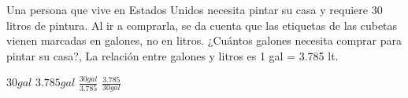 
\question Una persona que vive en Estados Unidos necesita pintar su casa
  y requiere 30 litros de pintura. Al ir a comprarla, se da cuenta que
  las etiquetas de las cubetas vienen marcadas en galones, no en litros.
  ¿Cuántos galones necesita comprar para pintar su casa?, La relación entre
  galones y litros es 1 gal = 3.785 lt.

  \begin{oneparchoices}
    \choice $30 gal$
    \choice $3.785 gal$
    \CorrectChoice $\frac{30 gal}{3.785}$
    \choice $\frac{3.785}{30 gal}$
  \end{oneparchoices}
  \answerline[C]
